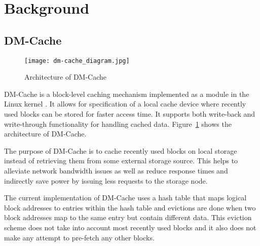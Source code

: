 \section{Background}

\subsection{DM-Cache}

\begin{figure}[htb]
  \caption{Architecture of DM-Cache}
  \centering \texttt{[image: dm-cache\_diagram.jpg]}
  \label{fig:dm-cache}
\end{figure}

DM-Cache is a block-level caching mechanism implemented as a module in the Linux
kernel \cite{DM-Cache}. It allows for specification of a local cache device
where recently used blocks can be stored for faster access time. It supports
both write-back and write-through functionality for handling cached
data. Figure~\ref{fig:dm-cache} shows the architecture of DM-Cache.

The purpose of DM-Cache is to cache recently used blocks on local storage
instead of retrieving them from some external storage source. This helps to
alleviate network bandwidth issues as well as reduce response times and
indirectly save power by issuing less requests to the storage node.

The current implementation of DM-Cache uses a hash table that maps logical block
addresses to entries within the hash table and evictions are done when two block
addresses map to the same entry but contain different data. This eviction scheme
does not take into account most recently used blocks and it also does not make
any attempt to pre-fetch any other blocks.

